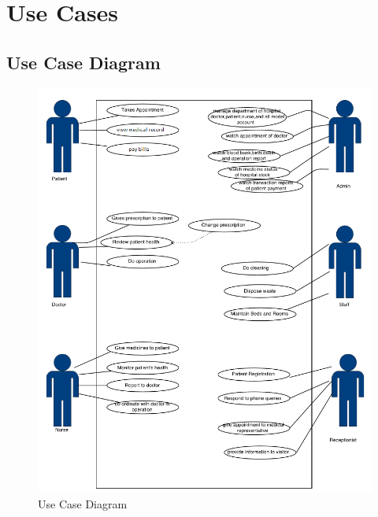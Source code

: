 \documentclass[14pt]{article}
\begin{document}
\section{Use Cases}
\subsection{Use Case Diagram }
\begin{figure}[h!]
\centering{}
  \caption{Use Case Diagram}
  \includegraphics[width=14.3cm]{hospitalDiagram1fixed.png}
\end{figure}
\newpage
\end{document}
